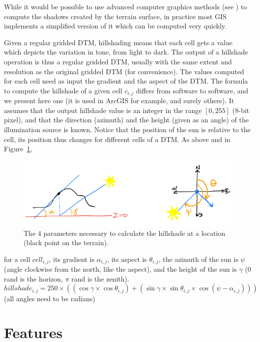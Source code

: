 While it would be possible to use advanced computer graphics methods (see ) to compute the shadows created by the terrain surface, in practice most GIS implements a simplified version of it which can be computed very quickly.

Given a regular gridded DTM, hillshading means that each cell gets a value which depicts the variation in tone, from light to dark.
The output of a hillshade operation is thus a regular gridded DTM, usually with the same extent and resolution as the original gridded DTM (for convenience).
The values computed for each cell need as input the gradient and the aspect of the DTM\@.
The formula to compute the hillshade of a given cell $c_{i,j}$ differs from software to software, and we present here one (it is used in ArcGIS for example, and surely others).
It assumes that the output hillshade value is an integer in the range $[0,255]$ (8-bit pixel), and that the direction (azimuth) and the height (given as an angle) of the illumination source is known.
Notice that the position of the sun is relative to the cell, its position thus changes for different cells of a DTM\@.
As above and in Figure~\ref{fig:hillshade-params}, 
\begin{figure}
  \centering
  \includegraphics[width=0.95\linewidth]{figs/hillshade-params}
  \caption{The 4 parameters necessary to calculate the hillshade at a location (black point on the terrain).}
\label{fig:hillshade-params}
\end{figure}
for a cell $cell_{i,j}$, its gradient is $\alpha_{i,j}$, its aspect is $\theta_{i,j}$, the azimuth of the sun is $\psi$ (angle clockwise from the north, like the aspect), and the height of the sun is $\gamma$ (0 rand is the horizon, $\pi$ rand is the zenith).
\[
  hillshade_{i,j} = 250 \times ((\cos\gamma \times \cos\theta_{i,j}) + (\sin\gamma \times \sin\theta_{i,j} \times \cos (\psi - \alpha_{i,j}))) 
\]
(all angles need to be radians)



%
\section{Features}


